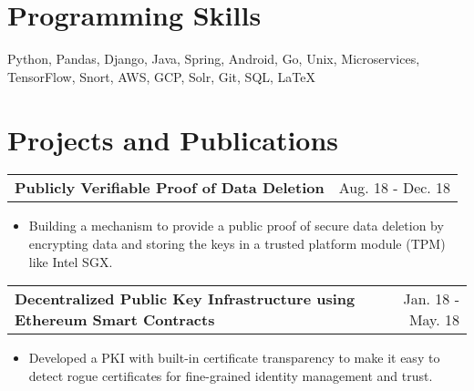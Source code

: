 \documentclass[a4paper,10pt]{article}
\makeatletter
\newcommand{\projectHeading}[2]{
    \begin{tabular*}{1\textwidth}{l@{\extracolsep{\fill}}r}
      \large{\textbf{#1}} & \small{#2} 
    \end{tabular*}
}
\newcommand{\resumeItemListStart}{\begin{itemize}[topsep=2.2pt, parsep=1pt, listparindent=0pt, itemindent=0pt, itemsep=1pt, leftmargin=*]}
\newcommand{\resumeItemListEnd}{\end{itemize}}
\makeatother
\begin{document}
      
 
    

\section{Programming Skills}
 \small{Python, Pandas, Django, \hfill{} Java, Spring, Android, Go, Unix, \hfill{} Microservices, \hfill{} TensorFlow, Snort, \hfill{} AWS, GCP, \hfill{} Solr, \hfill{} Git, SQL, \LaTeX}
		

\section{Projects and Publications}
    
    \projectHeading{Publicly Verifiable Proof of Data Deletion}{Aug. 18 - Dec. 18}
    \resumeItemListStart
    \item\small{Building a mechanism to provide a public proof of secure data deletion by encrypting data and storing the keys in a trusted platform module (TPM) like Intel SGX.}
    \resumeItemListEnd
    \projectHeading{Decentralized Public Key Infrastructure using Ethereum Smart Contracts}{Jan. 18 - May. 18} 
    \resumeItemListStart
     \item\small{Developed a PKI with built-in certificate transparency to make it easy to detect rogue certificates for fine-grained identity management and trust.}
    \resumeItemListEnd
    
\end{document}
